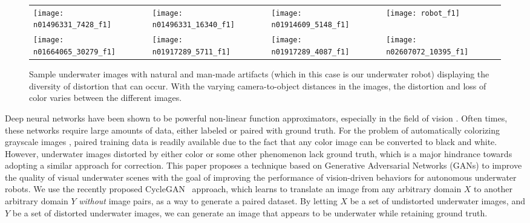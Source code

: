 \begin{figure}
\centering
\begin{tabular}{p{1.7cm} p{1.7cm} p{1.7cm} p{1.7cm}}
   
   \texttt{[image: n01496331\_7428\_f1]} &
   \texttt{[image: n01496331\_16340\_f1]} &
   \texttt{[image: n01914609\_5148\_f1]} &
   \texttt{[image: robot\_f1]} \\
   \texttt{[image: n01664065\_30279\_f1]} &
   \texttt{[image: n01917289\_5711\_f1]} &
   \texttt{[image: n01917289\_4087\_f1]} &
   \texttt{[image: n02607072\_10395\_f1]} \\

\end{tabular}
\label{fig:samples}
\caption{Sample underwater images with natural and man-made artifacts (which in this case is our underwater robot) displaying the 
diversity of distortion that can occur. With the varying camera-to-object distances in the images, the distortion and loss of 
color varies between the different images.}
\end{figure}

Deep neural networks have been shown to be powerful non-linear function approximators, especially in the field of vision 
\cite{krizhevsky2012imagenet}. Often times, these networks require large amounts of data, either labeled or paired with
ground truth. For the problem of automatically colorizing grayscale images \cite{zhang2016colorful}, paired training
data is
readily available due to the fact that any color image can be converted to black and white. However, underwater images distorted 
by either
color or some other phenomenon lack ground truth, which is a major hindrance towards adopting a similar approach for correction. 
This paper proposes a technique based on Generative Adversarial Networks (GANs) to improve the quality of visual underwater scenes 
with the goal of improving the performance of vision-driven behaviors for autonomous underwater robots.
We use the recently proposed CycleGAN~\cite{zhu2017unpaired} approach, which learns to translate an image from any arbitrary 
domain $X$ to another arbitrary domain $Y$ \textit{without} image pairs, as a way to generate a paired dataset.
By letting $X$ be a set of undistorted underwater images, and
$Y$ be a set of distorted underwater images, we can generate an image that appears to be underwater while retaining
ground truth.
